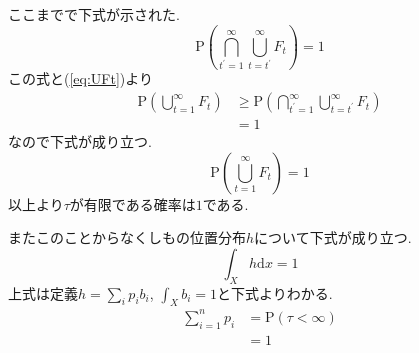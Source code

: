 ここまでで下式が示された. 
\begin{equation} \label{eq:PlimsupFt}
    \mathrm{P}\left( \bigcap_{t^{\prime}=1}^{\infty} \bigcup_{t=t^{\prime}}^{\infty} F_t \right) = 1
\end{equation}
この式と(\ref{eq:UFt})より
\begin{align}
    \mathrm{P}\left( \bigcup_{t=1}^{\infty} F_t \right) &\ge \mathrm{P}\left( \bigcap_{t^{\prime}=1}^{\infty} \bigcup_{t=t^{\prime}}^{\infty} F_t \right)\\
    &= 1
\end{align}
なので下式が成り立つ. 
\begin{equation}
    \mathrm{P}\left(\bigcup_{t=1}^{\infty} F_t \right) = 1
\end{equation}
以上より$ \tau $が有限である確率は$ 1 $である. 

またこのことからなくしもの位置分布$ h $について下式が成り立つ. 
\begin{equation}
    \int_X h \mathrm{d}x = 1
\end{equation}
上式は定義$ h = \sum_i p_i b_i $, $ \int_X b_i = 1 $と下式よりわかる. 
\begin{align}
    \sum_{i=1}^n p_i &= \mathrm{P}(\tau < \infty) \\
    &= 1
\end{align}
